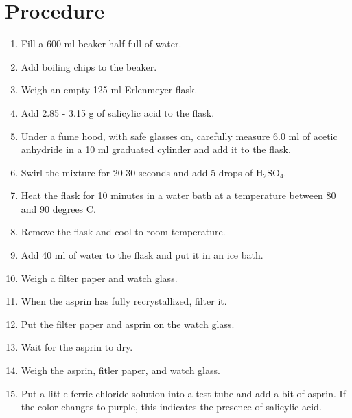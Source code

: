 \documentclass[12pt]{article}
\begin{document}
    \section*{Procedure}
        \begin{enumerate}
            \item Fill a 600 ml beaker half full of water.
            \item Add boiling chips to the beaker.
            \item Weigh an empty 125 ml Erlenmeyer flask.
            \item Add 2.85 - 3.15 g of salicylic acid to the flask.
            \item Under a fume hood, with safe glasses on, carefully measure 6.0 ml of acetic anhydride in a 10 ml graduated cylinder and add it to the flask.
            \item Swirl the mixture for 20-30 seconds and add 5 drops of \(\mathrm{H_2SO_4}\).
            \item Heat the flask for 10 minutes in a water bath at a temperature between 80 and 90 degrees C.
            \item Remove the flask and cool to room temperature.
            \item Add 40 ml of water to the flask and put it in an ice bath.
            \item Weigh a filter paper and watch glass.
            \item When the asprin has fully recrystallized, filter it.
            \item Put the filter paper and asprin on the watch glass.
            \item Wait for the asprin to dry.
            \item Weigh the asprin, fitler paper, and watch glass.
            \item Put a little ferric chloride solution into a test tube and add a bit of asprin. If the color changes to purple, this indicates the presence of salicylic acid.
        \end{enumerate}
\end{document}
